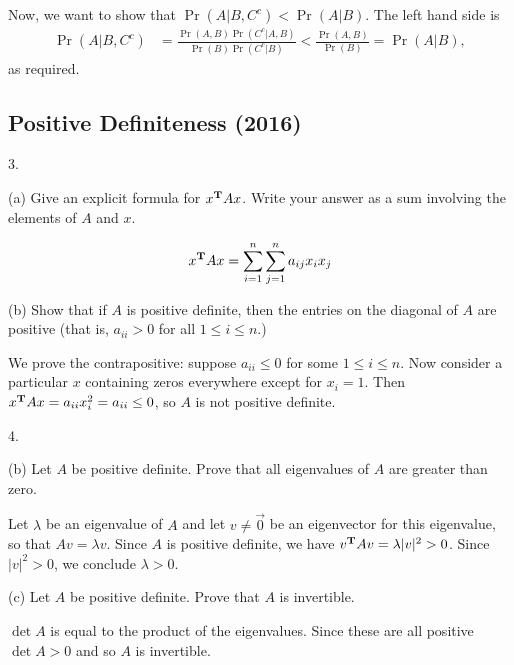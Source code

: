 \documentclass{article}
\renewcommand{\P}{\Pr}
\begin{document}
\begin{enumerate}[label=(\alph*)]
\begin{mdframed}
      Now, we want to show that $\Pr(A|B, C^c) < \Pr(A|B)$. The left hand side is
      \begin{align*}
        \P(A|B, C^c)
        &= \frac{\P(A,B)\P(C^c|A,B)}{\P(B)\P(C^c|B)}
        < \frac{\P(A,B)}{\P(B)} = \P(A|B),
      \end{align*}
      as required.

    \end{mdframed}

\end{enumerate}

\newpage

\subsection*{Positive Definiteness (2016)}

3.

(a) Give an explicit formula for $x^{\mathbf{T}} Ax$. Write your answer as a sum
involving the elements of $A$ and $x$.

\begin{mdframed}
  \begin{align*}
    x^{\mathbf{T}} A x = \sum_{i=1}^n \sum_{j=1}^n a_{ij}x_ix_j
  \end{align*}
\end{mdframed}

(b) Show that if $A$ is positive definite, then the entries on the diagonal of
$A$ are positive (that is, $a_{ii} > 0$ for all $1 \leq i \leq n$.)

\begin{mdframed}
  We prove the contrapositive: suppose $a_{ii} \leq 0$ for some
  $1 \leq i \leq n$. Now consider a particular $x$ containing zeros everywhere
  except for $x_i = 1$. Then $x^{\mathbf{T}} A x = a_{ii}x_i^2 = a_{ii} \leq 0$, so $A$
  is not positive definite.
\end{mdframed}


4.

(b) Let $A$ be positive definite. Prove that all eigenvalues of $A$ are greater than zero.
\begin{mdframed}
  Let $\lambda$ be an eigenvalue of $A$ and let $v \neq \vec 0$ be an eigenvector for
  this eigenvalue, so that $Av = \lambda v$. Since $A$ is positive
  definite, we have $v^{\mathbf{T}} Av = \lambda |v|^2 > 0$. Since
  $|v|^2 > 0$, we conclude $\lambda > 0$.
\end{mdframed}

(c) Let $A$ be positive definite. Prove that $A$ is invertible.
\begin{mdframed}
  $\det A$ is equal to the product of the eigenvalues. Since these are all
  positive $\det A > 0$ and so $A$ is invertible.
\end{mdframed}
\end{document}

